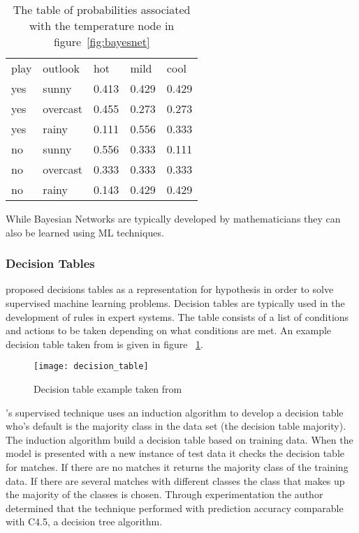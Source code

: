 \begin{table}[h]
\centering
\begin{tabular}{|ll|lll|}
\hline
 play & outlook & hot & mild & cool \\ \cline{1-5} 
 yes & sunny & 0.413 & 0.429 & 0.429 \\ 
 yes & overcast & 0.455 & 0.273 & 0.273 \\ 
 yes & rainy & 0.111 & 0.556 & 0.333 \\ 
 no & sunny & 0.556 & 0.333 & 0.111 \\ 
 no & overcast & 0.333 & 0.333 & 0.333 \\ 
 no & rainy & 0.143 & 0.429 & 0.429 \\ 
\hline
\end{tabular}
\caption{The table of probabilities associated with the temperature node in figure~\ref{fig:bayesnet} }
\label{tab:bayes_table}
\end{table}

While Bayesian Networks are typically developed by mathematicians they can also be learned using ML techniques. 


\subsubsection{Decision Tables}

\cite{kohavi1995power} proposed decisions tables as a representation for hypothesis in order to solve supervised machine learning problems. Decision tables are typically used in the development of rules in expert systems. The table consists of a list of conditions and actions to be taken depending on what conditions are met. An example decision table taken from \cite{hoffer1999modern} is given in figure ~\ref{fig:decision_table}.

\begin{figure}[!h]
\centering
\texttt{[image: decision\_table]}
\caption{Decision table example taken from \cite{hoffer1999modern}}
\label{fig:decision_table}
\end{figure}

\cite{kohavi1995power}'s supervised technique uses an induction algorithm to develop a decision table who's default is the majority class in the data set (the decision table majority). The induction algorithm build a decision table based on training data. When the model is presented with a new instance of test data it checks the decision table for matches. If there are no matches it returns the majority class of the training data. If there are several matches with different classes the class that makes up the majority of the classes is chosen. Through experimentation the author determined that the technique performed with prediction accuracy comparable with C4.5, a decision tree algorithm.

